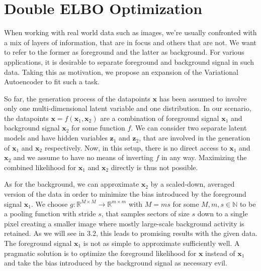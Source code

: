 \documentclass[12pt]{report}
\theoremstyle{definition}
\begin{document}
\section{Double ELBO Optimization}
When working with real world data such as images, we're usually confronted with a mix of layers of information, that are in focus and others that are not. We want to refer to the former as foreground and the latter as background. For various applications, it is desirable to separate foreground and background signal in such data. Taking this as motivation, we propose an expansion of the Variational Autoencoder to fit such a task.

So far, the generation process of the datapoints $\mathbf{x}$ has been assumed to involve only one multi-dimensional latent variable and one distribution. In our scenario, the datapoints $\mathbf{x} = f(\mathbf{x}_1, \mathbf{x}_2)$ are a combination of foreground signal $\mathbf{x}_1$ and background signal $\mathbf{x}_2$ for some function $f$.
We can consider two separate latent models and have hidden variables $\mathbf{z}_1$ and $\mathbf{z}_2$, that are involved in the generation of $\mathbf{x}_1$ and $\mathbf{x}_2$ respectively. Now, in this setup, there is no direct access to $\mathbf{x}_1$ and $\mathbf{x}_2$ and we assume to have no means of inverting $f$ in any way. Maximizing the combined likelihood for $\mathbf{x}_1$ and $\mathbf{x}_2$ directly is thus not possible.

As for the background, we can approximate $\mathbf{x}_2$ by a scaled-down, averaged version of the data in order to minimize the bias introduced by the foreground signal $\mathbf{x}_1$. We choose $g: \mathbb{R}^{M \times M} \rightarrow \mathbb{R}^{m \times m}$ with $M=ms$ for some $M, m, s \in \mathbb{N}$ to be a pooling function with stride $s$, that samples sectors of size $s$ down to a single pixel creating a smaller image where mostly large-scale background activity is retained. As we will see in 3.2, this leads to promising results with the given data.
The foreground signal $\mathbf{x}_1$ is not as simple to approximate sufficiently well. A pragmatic solution is to optimize the foreground likelihood for $\mathbf{x}$ instead of $\mathbf{x}_1$ and take the bias introduced by the background signal as necessary evil.
\end{document}
